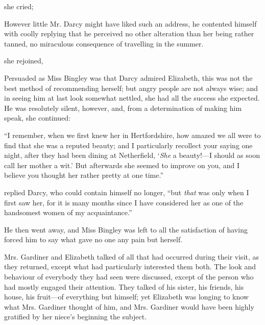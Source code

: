  she cried; 

However little Mr. Darcy might have liked such an address, he contented himself with coolly replying that he perceived no other alteration than her being rather tanned, no miraculous consequence of travelling in the summer.

 she rejoined, 

Persuaded as Miss Bingley was that Darcy admired Elizabeth, this was not the best method of recommending herself; but angry people are not always wise; and in seeing him at last look somewhat nettled, she had all the success she expected. He was resolutely silent, however, and, from a determination of making him speak, she continued:

“I remember, when we first knew her in Hertfordshire, how amazed we all were to find that she was a reputed beauty; and I particularly recollect your saying one night, after they had been dining at Netherfield, ‘{\em She} a beauty!---I should as soon call her mother a wit.' But afterwards she seemed to improve on you, and I believe you thought her rather pretty at one time.”

 replied Darcy, who could contain himself no longer, “but {\em that} was only when I first saw her, for it is many months since I have considered her as one of the handsomest women of my acquaintance.”

He then went away, and Miss Bingley was left to all the satisfaction of having forced him to say what gave no one any pain but herself.

Mrs. Gardiner and Elizabeth talked of all that had occurred during their visit, as they returned, except what had particularly interested them both. The look and behaviour of everybody they had seen were discussed, except of the person who had mostly engaged their attention. They talked of his sister, his friends, his house, his fruit---of everything but himself; yet Elizabeth was longing to know what Mrs. Gardiner thought of him, and Mrs. Gardiner would have been highly gratified by her niece's beginning the subject.


